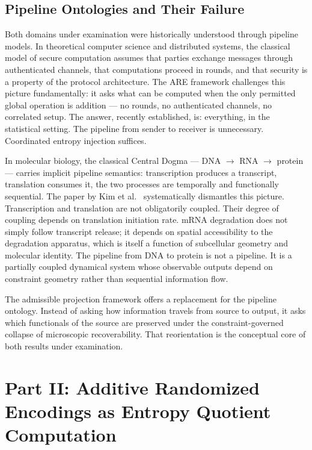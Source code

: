 \documentclass[12pt, a4paper]{article}
\theoremstyle{essaystyle}
\begin{document}
\subsection{Pipeline Ontologies and Their Failure}

Both domains under examination were historically understood through pipeline models.
In theoretical computer science and distributed systems, the classical model of secure
computation assumes that parties exchange messages through authenticated channels,
that computations proceed in rounds, and that security is a property of the protocol
architecture. The ARE framework challenges this picture fundamentally: it asks what can
be computed when the only permitted global operation is addition --- no rounds, no
authenticated channels, no correlated setup. The answer, recently established, is:
everything, in the statistical setting. The pipeline from sender to receiver is
unnecessary. Coordinated entropy injection suffices.

In molecular biology, the classical Central Dogma --- DNA $\to$ RNA $\to$ protein ---
carries implicit pipeline semantics: transcription produces a transcript, translation
consumes it, the two processes are temporally and functionally sequential. The paper by
Kim et al.\ \citep{kim2026spatial} systematically dismantles this picture.
Transcription and translation are not obligatorily coupled. Their degree of coupling
depends on translation initiation rate. mRNA degradation does not simply follow
transcript release; it depends on spatial accessibility to the degradation apparatus,
which is itself a function of subcellular geometry and molecular identity. The pipeline
from DNA to protein is not a pipeline. It is a partially coupled dynamical system whose
observable outputs depend on constraint geometry rather than sequential information flow.

The admissible projection framework offers a replacement for the pipeline ontology.
Instead of asking how information travels from source to output, it asks which
functionals of the source are preserved under the constraint-governed collapse of
microscopic recoverability. That reorientation is the conceptual core of both results
under examination.

\section{Part II: Additive Randomized Encodings as Entropy Quotient Computation}
\end{document}
